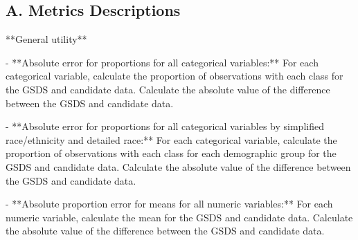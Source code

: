 \fancyfoot{}


\begin{FlushLeft}
    \part{A. Metrics Descriptions}
\end{FlushLeft}

**General utility**

-   **Absolute error for proportions for all categorical variables:** For each categorical variable, calculate the proportion of observations with each class for the GSDS and candidate data. Calculate the absolute value of the difference between the GSDS and candidate data.

-   **Absolute error for proportions for all categorical variables by simplified race/ethnicity and detailed race:** For each categorical variable, calculate the proportion of observations with each class for each demographic group for the GSDS and candidate data. Calculate the absolute value of the difference between the GSDS and candidate data.

-   **Absolute proportion error for means for all numeric variables:** For each numeric variable, calculate the mean for the GSDS and candidate data. Calculate the absolute value of the difference between the GSDS and candidate data.

